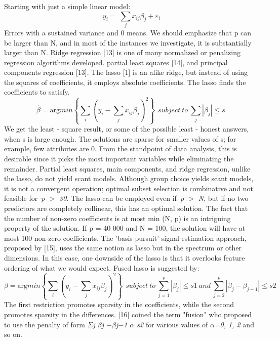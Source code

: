 \documentclass{article} %
\begin{document}
\noindent Starting with just a simple linear model:
\[y_i=\ \sum_j{x_{ij}{\beta }_j+{\varepsilon }_i}\] 
Errors with a sustained variance and 0 means. We should emphasize that p can be larger than N, and in most of the instances we investigate, it is substantially larger than N. Ridge regression [13] is one of many normalized or penalizing regression algorithms developed. partial least squares [14], and principal components regression [13]. The lasso [1] is an alike ridge, but instead of using the squares of coefficients, it employs absolute coefficients. The lasso finds the coefficients to satisfy.
\begin{equation} \label{GrindEQ__10_} 
\widehat{\beta }={\mathrm{arg} min\left\{\sum_i{{\left(y_i-\sum_j{x_{ij}{\beta }_j}\right)}^2}\right\}\ \ subject\ to\ \sum_j{\left|{\beta }_j\right|\le s}\ } 
\end{equation} 
We get the least - square result, or some of the possible least - honest answers, when s is large enough. The solutions are sparse for smaller values of s; for example, few attributes are 0. From the standpoint of data analysis, this is desirable since it picks the most important variables while eliminating the remainder. Partial least squares, main components, and ridge regression, unlike the lasso, do not yield scant models. Although group choice yields scant models, it is not a convergent operation; optimal subset selection is combinative and not feasible for~\textit{p $>$ 30}. The lasso can be employed even if~\textit{p $>$ N}, but if no two predictors are completely collinear, this has an optimal solution. The fact that the number of non-zero coefficients is at most min (N, p) is an intriguing property of the solution. If p = 40 000 and N = 100, the solution will have at most 100 non-zero coefficients. The 'basis pursuit' signal estimation approach, proposed by [15], uses the same notion as lasso but in the spectrum or other dimensions. In this case, one downside of the lasso is that it overlooks feature ordering of what we would expect. Fused lasso is suggested by:
\begin{equation} \label{GrindEQ__11_} 
\beta ={\mathrm{arg} min\left\{\sum_i{{\left(y_i-\sum_j{x_{ij}}{\beta }_j\right)}^2}\right\}\ }\ subject\ to\ \sum^p_{j=1}{\left|{\beta }_j\right|\le s1}\ and\ \sum^p_{j=2}{\left|{\beta }_j-{\beta }_{j-1}\right|\le s2}\  
\end{equation} 
The first restriction promotes sparsity in the coefficients, while the second promotes sparsity in the differences. [16] coined the term "fusion" who proposed to use the penalty of form \textit{$\mathit{\Sigma}$j {\textbar}$\beta$j $-$$\beta$j$-$1{\textbar} $\alpha$ s2} for various values of \textit{$\alpha$=0, 1, 2} and so on.
\end{document}
